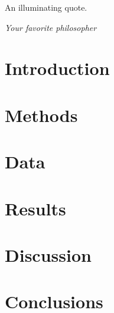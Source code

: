 \singlespacing
\epigraph{An illuminating quote.}{\textit{Your favorite philosopher}}
\doublespace

\section{Introduction}

\section{Methods}

\section{Data}

\section{Results}

\section{Discussion}

\section{Conclusions}